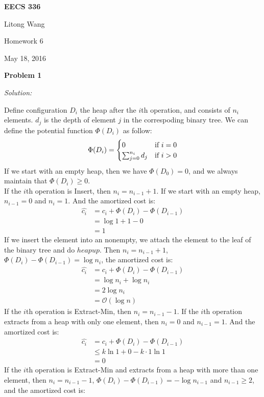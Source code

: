 \documentclass[12pt,letterpaper]{article}
\def\pp{\par\noindent}
\newcommand{\problem}[1]{ \bigskip \pp \textbf{Problem #1}\par}
\newcommand{\solution}{\textit{Solution:}\par}
\begin{document}
\centerline{\bf EECS 336}

\medskip
\centerline{Litong Wang}
\centerline{Homework 6}
\centerline{May 18, 2016}
\bigskip


\problem{1}
\solution
Define configuration $D_i$ the heap after the $i$th operation, and consists of $n_i$ elements. $d_j$ is the depth of element $j$ in the correspoding binary tree. We can define the potential function $\Phi(D_i)$ as follow: 
\begin{equation}
    \Phi(D_i)=
   \begin{cases}
   0 &\mbox{if $i = 0 $}\\
   \sum _{j=0} ^{n_i} d_j &\mbox{if $ i > 0$}
   \end{cases}
\end{equation}
If we start with an empty heap, then we have $\Phi(D_0) = 0$, and we always maintain that $\Phi(D_i) \ge 0.$ \\
If the $i$th operation is Insert, then $n_i = n_{i-1} + 1$. If we start with an empty heap, $n_{i-1} = 0$ and $n_i = 1$. And the amortized cost is: 
\begin{align*}
\widehat{c_i} &= c_i + \Phi(D_i) - \Phi(D_{i-1}) \\
&= \log 1 + 1 - 0 \\
&= 1
\end{align*}
If we insert the element into an nonempty, we attach the element to the leaf of the binary tree and do $heap up$. Then $n_i = n_{i-1} + 1$, $\Phi(D_i) - \Phi(D_{i-1}) = \log n_i$, the amortized cost is:
\begin{align*}
\widehat{c_i} &= c_i + \Phi(D_i) - \Phi(D_{i-1}) \\
&= \log n_i + \log n_i \\
&= 2 \log n_i \\
&= \mathcal{O}(\log n)
\end{align*}
If the $i$th operation is Extract-Min, then $n_i = n_{i-1} -1$. If the $i$th operation extracts from a heap with only one element, then $n_i = 0$ and $n_{i-1} = 1$. And the amortized cost is:
\begin{align*}
\widehat{c_i} &= c_i + \Phi(D_i) - \Phi(D_{i-1}) \\
&\le k \ln 1 + 0 - k \cdot 1 \ln 1 \\
&= 0
\end{align*}
If the $i$th operation is Extract-Min and extracts from a heap with more than one element, then $n_i = n_{i-1} - 1$, $\Phi(D_i) - \Phi(D_{i-1}) = - \log n_{i-1}$ and $n_{i-1} \ge 2$, and the amortized cost is:
\end{document}
